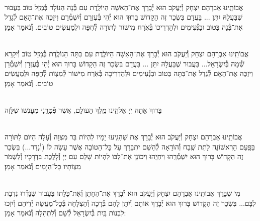 \documentclass[twoside, openany, parskip=half, 11pt]{book}
\begin{document}
\begin{sometimes}



\\
אֲבוֹתֵֽינוּ אַבְרָהָם יִצְחָק וְ֯יַעֲקֹב הוּא יְ֯בָרֵךְ אֶת־הָאִשָׁה הַיוֹלֶֽדֶת
עִם בְּ֯נָה הַנוֹלָד בְּ֯מַזָל טוֹב בַּעֲבוּר שֶׁבַּעֲלָהּ יִתֵּן ... בַּעֲדָם בִּשְׂכַר זֶה הַקָדוֹשׁ בָּרוּךְ הוּא יְ֯הִי בְּ֯עֶזְרָם וְ֯יִשְׁמְ֯רֵם וִיזַכֶּה אֶת־הָאֵם לְ֯גַדֵל אֶת־בְּ֯נָה בַּטוֹב וּבַנְּ֯עִימִים וּלְהַדְרִיכוֹ בְּ֯אֹֽרַח מִישׁוֹר לַתּוֹרָה לְ֯חֻפָּה וּלְמַעֲשִׂים טוֹבִים. וְ֯נֹאמַר אָמֵן׃



\\
אֲבוֹתֵֽינוּ אַבְרָהָם יִצְחָק וְ֯יַעֲקֹב הוּא יְ֯בָרֵךְ אֶת־הָאִשָׁה הַיוֹלֶֽדֶת
עִם בִּתָּה הַנוֹלֶֽדֶת בְּ֯מַזָל טוֹב וְ֯יִקָרֵא שְׁ֯מָהּ בְּ֯יִשְׂרָאֵל... בַּעֲבוּר שֶׁבַּעֲלָהּ יִתֵּן ... בַּעֲדָם בִּשְׂכַר זֶה הַקָדוֹשׁ בָּרוּךְ הוּא יְ֯הִי בְּ֯עֶזְרָן וְ֯יִשְׁמְ֯רֵן וִיזַכֶּה אֶת־הָאֵם לְ֯גַדֵל אֶת־בִּתָּה בַּטוֹב ובַנְּ֯עִימִים וּלְהַדְרִיכָה בְּ֯אֹֽרַח מִישׁוֹר לְ֯מִצְוֹת לְ֯חֻפָּה וּלְמַעֲשִׂים טוֹבִים. וְ֯נֹאמַר אָמֵן׃

\\
בָּרוּךְ אַתָּה יְיָ אֱלֹהֵֽינוּ מֶֽלֶךְ הָעוֹלָם, אֲשֶׁר פְּ֯טָרַֽנִי מֵעׇנְשׁוׂ שֶׁלָּזֶה

\\
אֲבוֹתֵֽינוּ אַבְרָהָם יִצְחָק וְ֯יַעֲקֹב הוּא יְ֯בָרֵךְ אֶת
שֶׁהִגִֽיעוּ יָמָיו לִהְיוֹת בַּר מִצְוָה וְ֯עָלָה הַיוֹם לַתּוֹרָה בַּפַּֽעַם הָרִאשׁוֹנָה לָתֵת שֶֽׁבַח וְ֯הוֹדָאָה לְ֯הַשֵׁם יִתְבָּרַךְ עַל כׇּל־הַטוֹבָה אֲשֶׁר עָשָׂה לוֹ (וְ֯נָדַר...) בִּשְׂכַר זֶה הַקָדוֹשׁ בָּרוּךְ הוּא יִשְׁמְ֯רֵֽהוּ וִיחַיֵֽהוּ וִיכוֹנֵן אֶת־לִבּוֹ לִהְיוֹת שָׁלֵם עִם יְיָ וְ֯לָלֶֽכֶת בִּדְרָכָיו וְ֯לִשְׁמֹר מִצְוֹתָיו כׇּל־הַיָמִים וְ֯נֹאמַר אָמֵן׃


\\
מִי שֶׁבֵּרַךְ אֲבוֹתֵֽינוּ אַבְרָהָם יִצְחָק וְ֯יַעֲקֹב הוּא יְ֯בָרֵךְ אֶת־הֶחָתָן  וְ֯אֶת־כַּלָתוֹ בַּעֲבוּר שֶׁנָדְ֯רוּ נִדְבַת לִבָּם... בִּשְׂכַר זֶה הַקָדוֹשׁ בָּרוּךְ הוּא יְ֯בָרֵךְ אוֹתָם וְ֯יִתֵּן לָהֶם בְּ֯רָכָה וְ֯הַצְלָחָה בְּ֯כׇל־מַעֲשֵׂה יְ֯דֵיהֶם וְ֯יִזְכוּ לִבְנוֹת בַּֽיִת בְּ֯יִשְׂרָאֵל לְ֯שֵׁם וְ֯לִתְהִלָה וְ֯נֹאמַר אָמֵן:


\end{sometimes}
\end{document}
